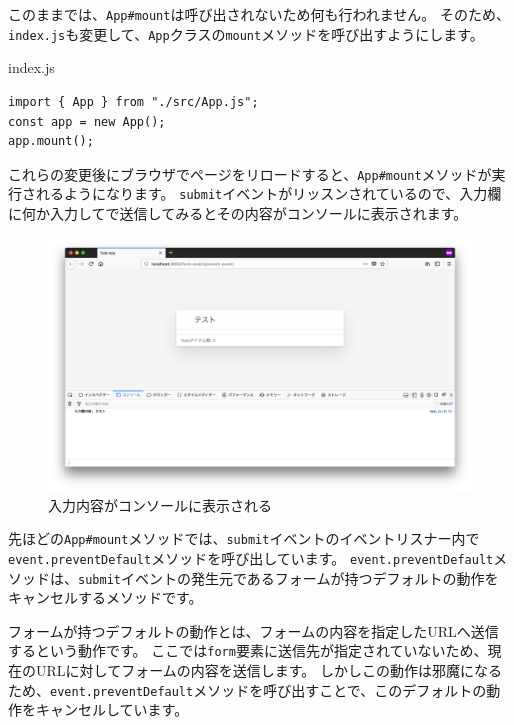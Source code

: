 このままでは、\texttt{App\#mount}は呼び出されないため何も行われません。
そのため、\texttt{index.js}も変更して、\texttt{App}クラスの\texttt{mount}メソッドを呼び出すようにします。

\begin{listtitle}
index.js
\end{listtitle}
\begin{lstlisting}
import { App } from "./src/App.js";
const app = new App();
app.mount();
\end{lstlisting}
\listend

これらの変更後にブラウザでページをリロードすると、\texttt{App\#mount}メソッドが実行されるようになります。
\texttt{submit}イベントがリッスンされているので、入力欄に何か入力してで送信してみるとその内容がコンソールに表示されます。

\begin{figure}[h]
\centering
\includegraphics[width=130mm]{./fig/form-event.png}
\caption{入力内容がコンソールに表示される}
\end{figure}

先ほどの\texttt{App\#mount}メソッドでは、\texttt{submit}イベントのイベントリスナー内で\texttt{event.preventDefault}メソッドを呼び出しています。
\texttt{event.preventDefault}メソッドは、\texttt{submit}イベントの発生元であるフォームが持つデフォルトの動作をキャンセルするメソッドです。

フォームが持つデフォルトの動作とは、フォームの内容を指定したURLへ送信するという動作です。
ここでは\texttt{form}要素に送信先が指定されていないため、現在のURLに対してフォームの内容を送信します。
しかしこの動作は邪魔になるため、\texttt{event.preventDefault}メソッドを呼び出すことで、このデフォルトの動作をキャンセルしています。

